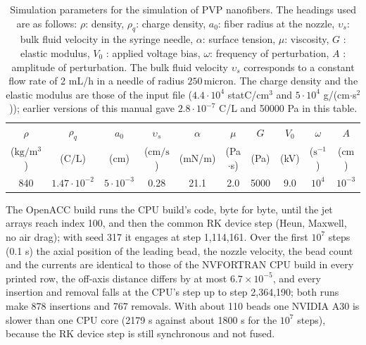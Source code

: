 \begin{table}
\begin{centering}
\begin{tabular}{cccccccccc}
\hline
$\rho$  & $\rho_{q}$  & $a_{0}$  & $\upsilon_{s}$  & $\alpha$  & $\mu$  & $G$  & $V_{0}$  & $\omega$  & $A$\tabularnewline
($\text{kg}/\text{m}^{3}$)  & ($\text{C}/\text{L}$)  & ($\text{cm}$)  & ($\text{cm/s}$)  & (mN/m)  & (Pa$\cdot$s)  & (Pa)  & (kV)  & ($\text{s}^{-1}$)  & ($\text{cm}$)\tabularnewline
\hline
\hline
840  & $1.47\cdot10^{-2}$  & $5\cdot10^{-3}$  & 0.28  & 21.1  & 2.0  & 5000  & 9.0  & $10^{4}$  & $10^{-3}$\tabularnewline
\hline
\end{tabular}
\par\end{centering}
\protect\protect\caption{Simulation parameters for the simulation of PVP nanofibers. The headings
used are as follows: $\rho$: density, $\rho_{q}$: charge density,
$a_{0}$: fiber radius at the nozzle, $\upsilon_{s}$: bulk fluid
velocity in the syringe needle, $\alpha$: surface tension, $\mu$:
viscosity, $G$ : elastic modulus, $V_{0}$ : applied voltage bias,
$\omega$: frequency of perturbation, $A$ : amplitude of perturbation.
The bulk fluid velocity $\upsilon_{s}$ corresponds to a constant flow
rate of 2 mL/h in a needle of radius $250\,$micron. The charge density and the elastic modulus
are those of the input file ($4.4\cdot10^{4}$ statC/cm$^{3}$ and
$5\cdot10^{4}$ g/(cm$\cdot$s$^{2}$)); earlier versions of this manual gave
$2.8\cdot10^{-7}$ C/L and 50000 Pa in this table.}

\label{tab:simulation-param}
\end{table}

The OpenACC build runs the CPU build's code, byte for byte, until the jet
arrays reach index 100, and then the common RK device step (Heun, Maxwell,
no air drag); with seed 317 it engages at step 1,114,161.  Over the first
$10^{7}$ steps (0.1 s) the axial position of the leading bead, the nozzle
velocity, the bead count and the currents are identical to those of the
NVFORTRAN CPU build in every printed row, the off-axis distance differs by
at most $6.7\times10^{-5}$, and every insertion and removal falls at the
CPU's step up to step 2,364,190; both runs make 878 insertions and 767
removals.  With about 110 beads one NVIDIA A30 is slower than one CPU core
(2179 s against about 1800 s for the $10^{7}$ steps), because the RK device
step is still synchronous and not fused.
